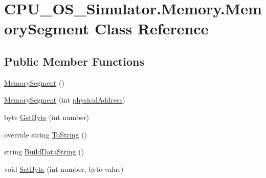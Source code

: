 \hypertarget{class_c_p_u___o_s___simulator_1_1_memory_1_1_memory_segment}{}\section{C\+P\+U\+\_\+\+O\+S\+\_\+\+Simulator.\+Memory.\+Memory\+Segment Class Reference}
\label{class_c_p_u___o_s___simulator_1_1_memory_1_1_memory_segment}
\subsection*{Public Member Functions}
\begin{DoxyCompactItemize}
\item 
\hyperlink{class_c_p_u___o_s___simulator_1_1_memory_1_1_memory_segment_abd9c898ff9488aaee755f538a3197477}{Memory\+Segment} ()
\item 
\hyperlink{class_c_p_u___o_s___simulator_1_1_memory_1_1_memory_segment_a92848c6604c9d6a9d958783ad7cae24f}{Memory\+Segment} (int \hyperlink{class_c_p_u___o_s___simulator_1_1_memory_1_1_memory_segment_a0477db48e8386456f2bd08632fd4508b}{physical\+Address})
\item 
byte \hyperlink{class_c_p_u___o_s___simulator_1_1_memory_1_1_memory_segment_af3e1120c597c91c8f7aa7faf29d3eda0}{Get\+Byte} (int number)
\item 
override string \hyperlink{class_c_p_u___o_s___simulator_1_1_memory_1_1_memory_segment_a1c94b824fe1fdfc4a0b817a031f3d51d}{To\+String} ()
\item 
string \hyperlink{class_c_p_u___o_s___simulator_1_1_memory_1_1_memory_segment_a7ad206d46b52b795ba48018afe0174ed}{Build\+Data\+String} ()
\item 
void \hyperlink{class_c_p_u___o_s___simulator_1_1_memory_1_1_memory_segment_ab445c7247c0ca2a7b52606b4d14e268a}{Set\+Byte} (int number, byte value)
\end{DoxyCompactItemize}

